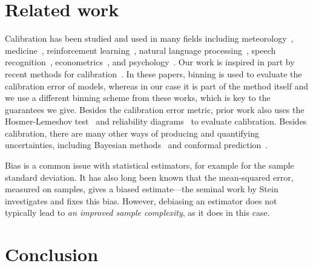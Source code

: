 \section{Related work}

Calibration has been studied and used in many fields including meteorology~\cite{murphy1973vector, murphy1977reliability, degroot1983forecasters,gneiting2005weather, brocker2009decomposition}, medicine~\cite{jiang2012calibrating, crowson2017calibration, harrell1996prognostic}, reinforcement learning~\cite{malik2019calibrated}, natural language processing~\cite{nguyen2015posterior, card2018calibration}, speech recognition~\cite{dong2011calibration}, econometrics~\cite{gneiting2007probabilistic}, and psychology~\cite{lichtenstein1982calibration}. Our work is inspired in part by recent methods for calibration~\cite{guo2017calibration, kuleshov2018accurate, hendrycks2019anomaly}. In these papers, binning is used to evaluate the calibration error of models, whereas in our case it is part of the method itself and we use a different binning scheme from these works, which is key to the guarantees we give. Besides the calibration error metric, prior work also uses the Hosmer-Lemeshov test~\cite{hosmer1980goodness} and reliability diagrams~\cite{degroot1983forecasters, brocker2007reliability} to evaluate calibration. Besides calibration, there are many other ways of producing and quantifying uncertainties, including Bayesian methods~\cite{gelman1995bayesian} and conformal prediction~\cite{shafer2008tutorial, lei2016distribution}.

Bias is a common issue with statistical estimators, for example for the sample standard deviation. It has also long been known that the mean-squared error, measured on samples, gives a biased estimate---the seminal work by Stein~\cite{stein81sure} investigates and fixes this bias. However, debiasing an estimator does not typically lead to \emph{an improved sample complexity}, as it does in this case.


\section{Conclusion}

